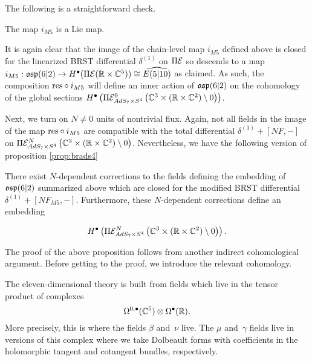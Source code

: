 The following is a straightforward check.
\begin{lem}\label{lem:m5emb}
The map $i_{M5}$ is a Lie map.
\end{lem} 

It is again clear that the image of the chain-level map $i_{M5}$ defined above is closed for the linearized BRST differential $\delta^{(1)}$ on $\Pi \mathcal{E}$ so descends to a map $i_{M5} : \mathfrak{osp}(6|2) \to H^\bullet (\Pi \mathcal{E} (\mathbb{R}\times \mathbb{C}^5))\cong \widehat{E (5|10)}$ as claimed. As such, the composition $\mathrm{res}\circ i_{M5}$ will define an inner action of $\mathfrak{osp}(6|2)$ on the cohomology of the global sections $H^\bullet \left ( \Pi \mathcal{E}^{0}_{AdS_7\times S^4} \left ( \mathbb{C}^3\times (\mathbb{R}\times \mathbb{C}^2)\setminus 0\right )\right )$. 

\parsec[]

Next, we turn on $N \ne 0$  units of nontrivial flux. Again, not all fields in the image of the map $\mathrm{res}\circ i_{M5}$ are compatible with the total differential $\delta^{(1)} + [N F, -]$ on $\Pi \mathcal{E}^{N}_{AdS_7\times S^4} \left ( \mathbb{C}^3\times (\mathbb{R}\times \mathbb{C}^2)\setminus 0\right )$. Nevertheless, we have the following version of proposition \ref{prop:brads4}

\begin{prop}
\label{prop:brads7}
There exist $N$-dependent corrections to the fields defining the embedding of $\mathfrak{osp}(6|2)$ summarized above which are closed for the modified BRST differential $\delta^{(1)} + [N F_{M5},-]$. Furthermore, these $N$-dependent corrections define an embedding 

\[ H^\bullet \left ( \Pi \mathcal{E}^N_{AdS_7\times S^4} \left ( \mathbb{C}^3 \times (\mathbb{R}\times \mathbb{C}^2)\setminus 0 \right ) \right). \]

\end{prop}

\iffalse
\parsec[s:thfcohomology]

The proof of the above proposition follows from another indirect cohomological argument. 
Before getting to the proof, we introduce the relevant cohomology. 

The eleven-dimensional theory is built from fields which live in the tensor product of complexes 
\[
\Omega^{0,\bullet}(\mathbb{C}^5) \otimes \Omega^\bullet(\mathbb{R}).
\]
More precisely, this is where the  fields $\beta$ and~$\nu$ live. 
The $\mu$ and~$\gamma$ fields live in versions of this complex where we take Dolbeault forms with coefficients in the holomorphic tangent and cotangent bundles, respectively. 


